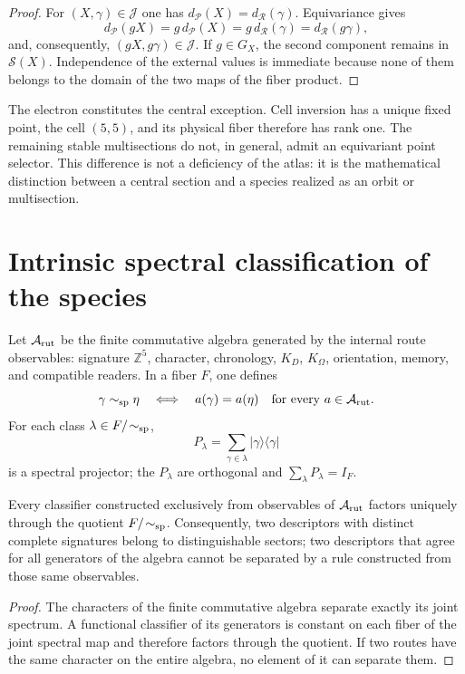 \begin{proof}
For \((X,\gamma)\in\mathcal J\) one has
\(d_{\mathcal P}(X)=d_{\mathcal R}(\gamma)\). Equivariance gives
\[
 d_{\mathcal P}(gX)=g\,d_{\mathcal P}(X)
 =g\,d_{\mathcal R}(\gamma)=d_{\mathcal R}(g\gamma),
\]
and, consequently, \((gX,g\gamma)\in\mathcal J\). If \(g\in G_X\), the
second component remains in \(\mathscr S(X)\). Independence of the
external values is immediate because none of them belongs to the domain
of the two maps of the fiber product.
\end{proof}

The electron constitutes the central exception. Cell inversion has a unique fixed point, the cell \((5,5)\), and its physical fiber therefore has rank one. The remaining stable multisections do not, in general, admit an equivariant point selector. This difference is not a deficiency of the atlas: it is the mathematical distinction between a central section and a species realized as an orbit or multisection.

\section{Intrinsic spectral classification of the species}

Let \(\mathcal A_{\rm rut}\) be the finite commutative algebra generated by the
internal route observables: signature \(\mathbb Z^5\), character, chronology,
\(K_D\), \(K_\Omega\), orientation, memory, and compatible readers. In a
fiber \(F\), one defines
\[
 \gamma\sim_{\rm sp}\eta
 \quad\Longleftrightarrow\quad
 a(\gamma)=a(\eta)\quad\text{for every }a\in\mathcal A_{\rm rut}.
\]
For each class \(\lambda\in F/\!\sim_{\rm sp}\),
\[
 P_\lambda=\sum_{\gamma\in\lambda}
 |\gamma\rangle\langle\gamma|
\]
is a spectral projector; the \(P_\lambda\) are orthogonal and
\(\sum_\lambda P_\lambda=I_F\).

\begin{theorem}
Every classifier constructed exclusively from observables of \(\mathcal A_{\rm rut}\) factors uniquely through the quotient \(F/\!\sim_{\rm sp}\). Consequently, two descriptors with distinct complete signatures belong to distinguishable sectors; two descriptors that agree for all generators of the algebra cannot be separated by a rule constructed from those same observables.
\end{theorem}

\begin{proof}
The characters of the finite commutative algebra separate exactly its
joint spectrum. A functional classifier of its generators is constant
on each fiber of the joint spectral map and therefore factors through the
quotient. If two routes have the same character on the entire algebra, no
element of it can separate them.
\end{proof}

